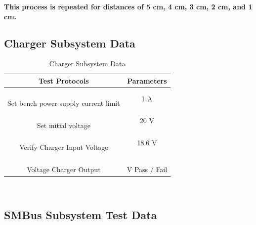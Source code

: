 \documentclass[12pt]{article}
\begin{document}
\noindent
\textbf{This process is repeated for distances of 5 cm, 4 cm, 3 cm, 2 cm, and 1 cm.}

\subsection{Charger Subsystem Data}

\begin{table}[h!]
\centering
\caption*{Charger Subsystem Data}
\begin{tabular}{ | c | c | }
\hline
\textbf{Test Protocols} & \textbf{Parameters} \\
\hline
\parbox{0.5\linewidth}{\raggedright \hfill \\[-0.25 em]
Set bench power supply current limit
 \hfill \\[0.1 em]} & 
 1 A \\
\hline
\parbox{0.5\linewidth}{\raggedright \hfill \\[-0.25 em]
Set initial voltage
\hfill \\[0.1 em]} & 
20 V\\
\hline
\parbox{0.5\linewidth}{\raggedright \hfill \\[-0.25 em]
Verify Charger Input Voltage
\hfill \\[0.1 em]} &  
18.6 V\\
\hline
\parbox{0.5\linewidth}{\raggedright \hfill \\[-0.25 em]
Voltage Charger Output
\hfill \\[0.1 em]} &  \parbox{0.4\linewidth}{\raggedright \hfill \\ [0.7 em] \underline{\hspace{0.625in}} 
V 
\hspace{0.125 in}Pass \space / \space  Fail \hfill \\ [0.3 em]} \\ 
\hline
\end{tabular}
\end{table}
\hfill \\
\pagebreak

\subsection{SMBus Subsystem Test  Data}
\end{document}
